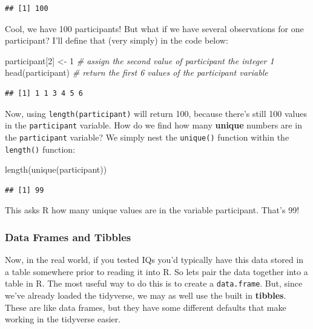 \documentclass[
]{book}
\newenvironment{Shaded}{\begin{snugshade}}{\end{snugshade}}
\newcommand{\CommentTok}[1]{\textcolor[rgb]{0.56,0.35,0.01}{\textit{#1}}}
\newcommand{\DecValTok}[1]{\textcolor[rgb]{0.00,0.00,0.81}{#1}}
\newcommand{\FunctionTok}[1]{\textcolor[rgb]{0.00,0.00,0.00}{#1}}
\newcommand{\NormalTok}[1]{#1}
\newcommand{\OtherTok}[1]{\textcolor[rgb]{0.56,0.35,0.01}{#1}}
\begin{document}
\begin{verbatim}
## [1] 100
\end{verbatim}

Cool, we have 100 participants! But what if we have several observations for one participant? I'll define that (very simply) in the code below:

\begin{Shaded}
\begin{Highlighting}[]
\NormalTok{participant[}\DecValTok{2}\NormalTok{] }\OtherTok{\textless{}{-}} \DecValTok{1} \CommentTok{\# assign the second value of participant the integer 1}
\FunctionTok{head}\NormalTok{(participant) }\CommentTok{\# return the first 6 values of the participant variable}
\end{Highlighting}
\end{Shaded}

\begin{verbatim}
## [1] 1 1 3 4 5 6
\end{verbatim}

Now, using \texttt{length(participant)} will return 100, because there's still 100 values in the \texttt{participant} variable. How do we find how many \textbf{unique} numbers are in the \texttt{participant} variable? We simply nest the \texttt{unique()} function within the \texttt{length()} function:

\begin{Shaded}
\begin{Highlighting}[]
\FunctionTok{length}\NormalTok{(}\FunctionTok{unique}\NormalTok{(participant))}
\end{Highlighting}
\end{Shaded}

\begin{verbatim}
## [1] 99
\end{verbatim}

This asks R how many unique values are in the variable participant. That's 99!

\hypertarget{data-frames-and-tibbles}{%
\subsubsection{Data Frames and Tibbles}\label{data-frames-and-tibbles}}

Now, in the real world, if you tested IQs you'd typically have this data stored in a table somewhere prior to reading it into R. So lets pair the data together into a table in R. The most useful way to do this is to create a \texttt{data.frame}. But, since we've already loaded the tidyverse, we may as well use the built in \textbf{tibbles}. These are like data frames, but they have some different defaults that make working in the tidyverse easier.
\end{document}
